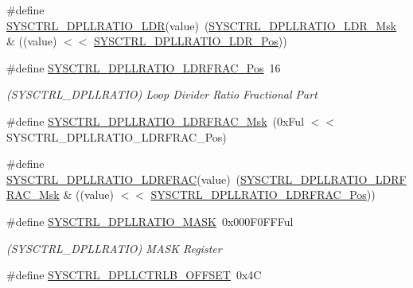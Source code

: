 \begin{DoxyCompactItemize}
\#define \mbox{\hyperlink{group___s_a_m_d21___s_y_s_c_t_r_l_ga1c5b12f6409f9d10f2451d6cdf116065}{S\+Y\+S\+C\+T\+R\+L\+\_\+\+D\+P\+L\+L\+R\+A\+T\+I\+O\+\_\+\+L\+DR}}(value)~(\mbox{\hyperlink{group___s_a_m_d21___s_y_s_c_t_r_l_ga3c5e034ed9b9a16884741f783e1215b4}{S\+Y\+S\+C\+T\+R\+L\+\_\+\+D\+P\+L\+L\+R\+A\+T\+I\+O\+\_\+\+L\+D\+R\+\_\+\+Msk}} \& ((value) $<$$<$ \mbox{\hyperlink{group___s_a_m_d21___s_y_s_c_t_r_l_gab84b0699148696285e95394ae4624f7a}{S\+Y\+S\+C\+T\+R\+L\+\_\+\+D\+P\+L\+L\+R\+A\+T\+I\+O\+\_\+\+L\+D\+R\+\_\+\+Pos}}))
\item 
\#define \mbox{\hyperlink{group___s_a_m_d21___s_y_s_c_t_r_l_gad3a55f9f2a5718895a6aa1238dd710b9}{S\+Y\+S\+C\+T\+R\+L\+\_\+\+D\+P\+L\+L\+R\+A\+T\+I\+O\+\_\+\+L\+D\+R\+F\+R\+A\+C\+\_\+\+Pos}}~16
\begin{DoxyCompactList}\small\item\em (S\+Y\+S\+C\+T\+R\+L\+\_\+\+D\+P\+L\+L\+R\+A\+T\+IO) Loop Divider Ratio Fractional Part \end{DoxyCompactList}\item 
\#define \mbox{\hyperlink{group___s_a_m_d21___s_y_s_c_t_r_l_ga88bf5d45bf62074885bff562159db588}{S\+Y\+S\+C\+T\+R\+L\+\_\+\+D\+P\+L\+L\+R\+A\+T\+I\+O\+\_\+\+L\+D\+R\+F\+R\+A\+C\+\_\+\+Msk}}~(0x\+Ful $<$$<$ S\+Y\+S\+C\+T\+R\+L\+\_\+\+D\+P\+L\+L\+R\+A\+T\+I\+O\+\_\+\+L\+D\+R\+F\+R\+A\+C\+\_\+\+Pos)
\item 
\#define \mbox{\hyperlink{group___s_a_m_d21___s_y_s_c_t_r_l_gaf5d3aa1135045aee7f5e0831123de415}{S\+Y\+S\+C\+T\+R\+L\+\_\+\+D\+P\+L\+L\+R\+A\+T\+I\+O\+\_\+\+L\+D\+R\+F\+R\+AC}}(value)~(\mbox{\hyperlink{group___s_a_m_d21___s_y_s_c_t_r_l_ga88bf5d45bf62074885bff562159db588}{S\+Y\+S\+C\+T\+R\+L\+\_\+\+D\+P\+L\+L\+R\+A\+T\+I\+O\+\_\+\+L\+D\+R\+F\+R\+A\+C\+\_\+\+Msk}} \& ((value) $<$$<$ \mbox{\hyperlink{group___s_a_m_d21___s_y_s_c_t_r_l_gad3a55f9f2a5718895a6aa1238dd710b9}{S\+Y\+S\+C\+T\+R\+L\+\_\+\+D\+P\+L\+L\+R\+A\+T\+I\+O\+\_\+\+L\+D\+R\+F\+R\+A\+C\+\_\+\+Pos}}))
\item 
\#define \mbox{\hyperlink{group___s_a_m_d21___s_y_s_c_t_r_l_ga47495325b632e651832329164e2e28da}{S\+Y\+S\+C\+T\+R\+L\+\_\+\+D\+P\+L\+L\+R\+A\+T\+I\+O\+\_\+\+M\+A\+SK}}~0x000\+F0\+F\+F\+Ful
\begin{DoxyCompactList}\small\item\em (S\+Y\+S\+C\+T\+R\+L\+\_\+\+D\+P\+L\+L\+R\+A\+T\+IO) M\+A\+SK Register \end{DoxyCompactList}\item 
\#define \mbox{\hyperlink{group___s_a_m_d21___s_y_s_c_t_r_l_ga12de9ec3c36ffed661d05f737956602d}{S\+Y\+S\+C\+T\+R\+L\+\_\+\+D\+P\+L\+L\+C\+T\+R\+L\+B\+\_\+\+O\+F\+F\+S\+ET}}~0x4C
$$
\end{DoxyCompactItemize}
